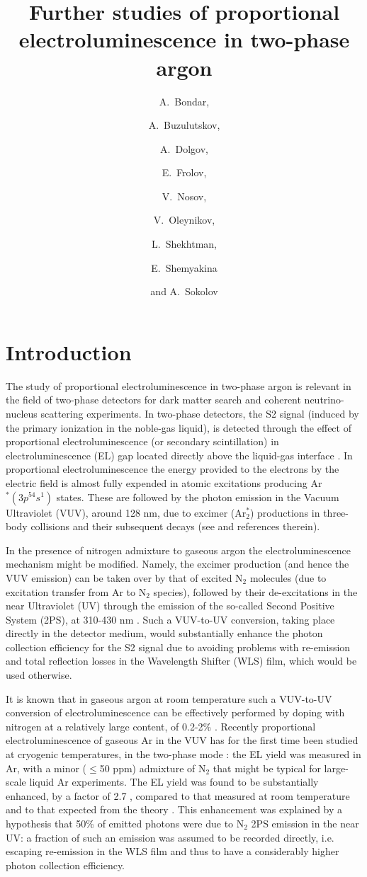 \documentclass[a4paper,11pt]{article}
\title{\boldmath Further studies of proportional electroluminescence in two-phase argon}
\author[a,b]{A.~Bondar,}
\author[a,b]{A.~Buzulutskov,}
\author[b]{A.~Dolgov,}
\author[a,b]{E.~Frolov,}
\author[a,b]{V.~Nosov,}
\author[a,b]{V.~Oleynikov,}
\author[a,b]{L.~Shekhtman,}
\author[a,b,1]{E.~Shemyakina\note{Corresponding author.}}
\author[a,b]{and A.~Sokolov}
\affiliation[a]{Budker Institute of Nuclear Physics, \\Lavrentiev ave. 11, Novosibirsk 630090, Russia}
\affiliation[b]{Novosibirsk State University,\\ Pirogova st. 2, Novosibirsk 630090, Russia}
\begin{document}
\maketitle
\flushbottom

\section{Introduction}

The study of proportional electroluminescence in two-phase argon is relevant in the field of two-phase detectors for dark matter search \cite{DarkSide15} and coherent neutrino-nucleus scattering \cite{CoNu04,CoNu09} experiments. In two-phase detectors, the S2 signal (induced by the primary ionization in the noble-gas liquid), is detected through the effect of proportional electroluminescence (or secondary scintillation) in electroluminescence (EL) gap located directly above the liquid-gas interface \cite{NobleRev13}. In proportional electroluminescence the energy provided to the electrons by the electric field is almost fully expended in atomic excitations producing Ar$^{\ast}(3p^54s^1)$ states. These are followed by the photon emission in the Vacuum Ultraviolet (VUV), around 128 nm, due to excimer (Ar$^{\ast}_2$) productions in three-body collisions and their subsequent decays (see \cite{ArXeN2Proc17} and references therein).

In the presence of nitrogen admixture to gaseous argon the electroluminescence mechanism might be modified. Namely, the excimer production (and hence the VUV emission) can be taken over by that of excited N$_2$ molecules (due to excitation transfer from Ar to N$_2$ species), followed by their de-excitations in the near Ultraviolet (UV) through the emission of the so-called Second Positive System (2PS), at 310-430 nm \cite{ArXeN2Proc17}. Such a VUV-to-UV conversion, taking place directly in the detector medium, would substantially enhance the photon collection efficiency for the S2 signal due to avoiding problems with re-emission and total reflection losses in the Wavelength Shifter (WLS) film, which would be used otherwise.

It is known that in gaseous argon at room temperature such a VUV-to-UV conversion of electroluminescence can be effectively performed by doping with nitrogen at a relatively large content, of 0.2-2\% \cite{Policarpo67,Takahashi83,Kazkaz10}. Recently proportional electroluminescence of gaseous Ar in the VUV has for the first time been studied at cryogenic temperatures, in the two-phase mode \cite{CRADPropEL15,CRADELGap17}: the EL yield was measured in Ar, with a minor ($\leq$50 ppm) admixture of N$_2$ that might be typical for large-scale liquid Ar experiments.   The EL yield was found to be substantially enhanced, by a factor of 2.7 \cite{CRADPropEL15}, compared to that measured at room temperature \cite{ArELExp08} and to that expected from the theory \cite{ArELTheory11}. This enhancement was explained by a hypothesis that 50\% of emitted photons were due to N$_2$ 2PS emission in the near UV: a fraction of such an emission was assumed to be recorded directly, i.e. escaping re-emission in the WLS film and thus to have a considerably higher photon collection efficiency.
\end{document}
